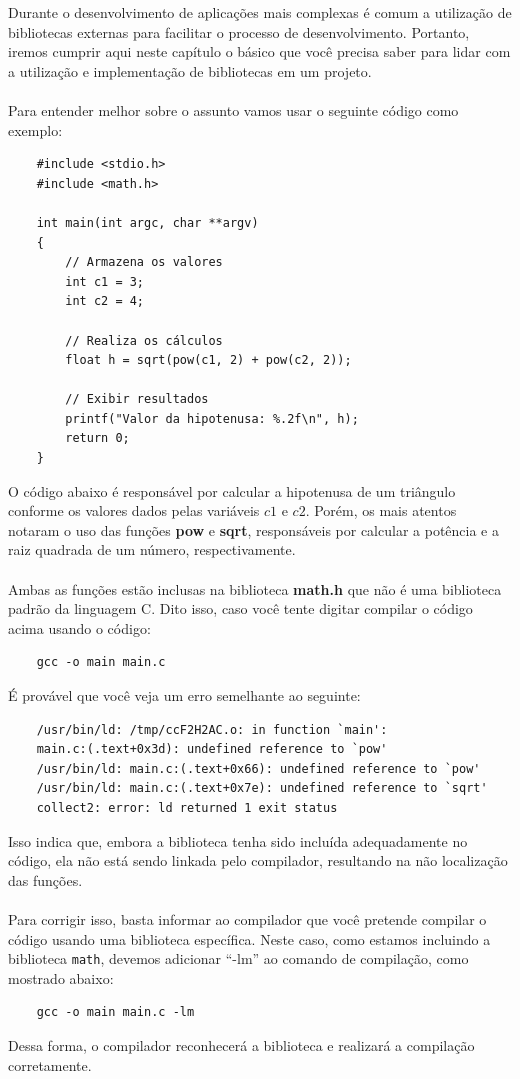 Durante o desenvolvimento de aplicações mais complexas é comum a utilização 
de bibliotecas externas para facilitar o processo de desenvolvimento. Portanto, 
iremos cumprir aqui neste capítulo o básico que você precisa saber para lidar com 
a utilização e implementação de bibliotecas em um projeto.
\\\\
Para entender melhor sobre o assunto vamos usar o seguinte código como exemplo:

\begin{verbatim}
    #include <stdio.h>
    #include <math.h>

    int main(int argc, char **argv)
    {
        // Armazena os valores
        int c1 = 3;
        int c2 = 4;

        // Realiza os cálculos
        float h = sqrt(pow(c1, 2) + pow(c2, 2));

        // Exibir resultados
        printf("Valor da hipotenusa: %.2f\n", h);
        return 0;
    }
\end{verbatim}

O código abaixo é responsável por calcular a hipotenusa de um triângulo 
conforme os valores dados pelas variáveis \(c1\) e \(c2\). Porém, os mais 
atentos notaram o uso das funções \textbf{pow} e \textbf{sqrt}, responsáveis 
por calcular a potência e a raiz quadrada de um número, respectivamente.
\\\\
Ambas as funções estão inclusas na biblioteca \textbf{math.h} que não é uma 
biblioteca padrão da linguagem C. Dito isso, caso você tente digitar compilar 
o código acima usando o código:

\begin{verbatim}
    gcc -o main main.c
\end{verbatim}

É provável que você veja um erro semelhante ao seguinte:

\begin{verbatim}
    /usr/bin/ld: /tmp/ccF2H2AC.o: in function `main':
    main.c:(.text+0x3d): undefined reference to `pow'
    /usr/bin/ld: main.c:(.text+0x66): undefined reference to `pow'
    /usr/bin/ld: main.c:(.text+0x7e): undefined reference to `sqrt'
    collect2: error: ld returned 1 exit status
\end{verbatim}

Isso indica que, embora a biblioteca tenha sido incluída adequadamente no 
código, ela não está sendo linkada pelo compilador, resultando na não 
localização das funções.
\\\\
Para corrigir isso, basta informar ao compilador que você pretende compilar o código usando uma biblioteca específica. Neste caso, como estamos incluindo a biblioteca \texttt{math}, devemos adicionar ``-lm'' ao comando de compilação, como mostrado abaixo:

\begin{verbatim}
    gcc -o main main.c -lm
\end{verbatim}

Dessa forma, o compilador reconhecerá a biblioteca e realizará a compilação 
corretamente.
